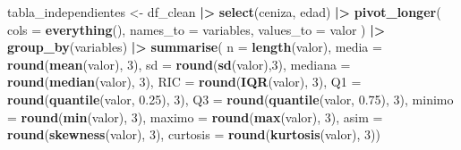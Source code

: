\documentclass[
]{book}
\newenvironment{Shaded}{\begin{snugshade}}{\end{snugshade}}
\newcommand{\AttributeTok}[1]{\textcolor[rgb]{0.13,0.29,0.53}{#1}}
\newcommand{\DecValTok}[1]{\textcolor[rgb]{0.00,0.00,0.81}{#1}}
\newcommand{\FloatTok}[1]{\textcolor[rgb]{0.00,0.00,0.81}{#1}}
\newcommand{\FunctionTok}[1]{\textcolor[rgb]{0.13,0.29,0.53}{\textbf{#1}}}
\newcommand{\NormalTok}[1]{#1}
\newcommand{\OtherTok}[1]{\textcolor[rgb]{0.56,0.35,0.01}{#1}}
\newcommand{\SpecialCharTok}[1]{\textcolor[rgb]{0.81,0.36,0.00}{\textbf{#1}}}
\newcommand{\StringTok}[1]{\textcolor[rgb]{0.31,0.60,0.02}{#1}}
\begin{document}
\begin{Shaded}
\begin{Highlighting}[]
\NormalTok{tabla\_independientes }\OtherTok{\textless{}{-}}\NormalTok{ df\_clean }\SpecialCharTok{|\textgreater{}} \FunctionTok{select}\NormalTok{(ceniza, edad) }\SpecialCharTok{|\textgreater{}} 
  \FunctionTok{pivot\_longer}\NormalTok{(}
    \AttributeTok{cols =} \FunctionTok{everything}\NormalTok{(),}
    \AttributeTok{names\_to =} \StringTok{\textquotesingle{}variables\textquotesingle{}}\NormalTok{,}
    \AttributeTok{values\_to =} \StringTok{\textquotesingle{}valor\textquotesingle{}}
\NormalTok{  ) }\SpecialCharTok{|\textgreater{}} 
  \FunctionTok{group\_by}\NormalTok{(variables) }\SpecialCharTok{|\textgreater{}} 
             \FunctionTok{summarise}\NormalTok{(    }
    \AttributeTok{n =} \FunctionTok{length}\NormalTok{(valor),}
    \AttributeTok{media =} \FunctionTok{round}\NormalTok{(}\FunctionTok{mean}\NormalTok{(valor), }\DecValTok{3}\NormalTok{),}
    \AttributeTok{sd =} \FunctionTok{round}\NormalTok{(}\FunctionTok{sd}\NormalTok{(valor),}\DecValTok{3}\NormalTok{),}
    \AttributeTok{mediana =} \FunctionTok{round}\NormalTok{(}\FunctionTok{median}\NormalTok{(valor), }\DecValTok{3}\NormalTok{),}
    \AttributeTok{RIC =} \FunctionTok{round}\NormalTok{(}\FunctionTok{IQR}\NormalTok{(valor), }\DecValTok{3}\NormalTok{),}
    \AttributeTok{Q1 =} \FunctionTok{round}\NormalTok{(}\FunctionTok{quantile}\NormalTok{(valor, }\FloatTok{0.25}\NormalTok{), }\DecValTok{3}\NormalTok{),}
    \AttributeTok{Q3 =} \FunctionTok{round}\NormalTok{(}\FunctionTok{quantile}\NormalTok{(valor, }\FloatTok{0.75}\NormalTok{), }\DecValTok{3}\NormalTok{),}
    \AttributeTok{minimo  =} \FunctionTok{round}\NormalTok{(}\FunctionTok{min}\NormalTok{(valor), }\DecValTok{3}\NormalTok{),}
    \AttributeTok{maximo  =} \FunctionTok{round}\NormalTok{(}\FunctionTok{max}\NormalTok{(valor), }\DecValTok{3}\NormalTok{),}
    \AttributeTok{asim    =} \FunctionTok{round}\NormalTok{(}\FunctionTok{skewness}\NormalTok{(valor), }\DecValTok{3}\NormalTok{),}
    \AttributeTok{curtosis =} \FunctionTok{round}\NormalTok{(}\FunctionTok{kurtosis}\NormalTok{(valor), }\DecValTok{3}\NormalTok{))}


\end{Highlighting}
\end{Shaded}
\end{document}
